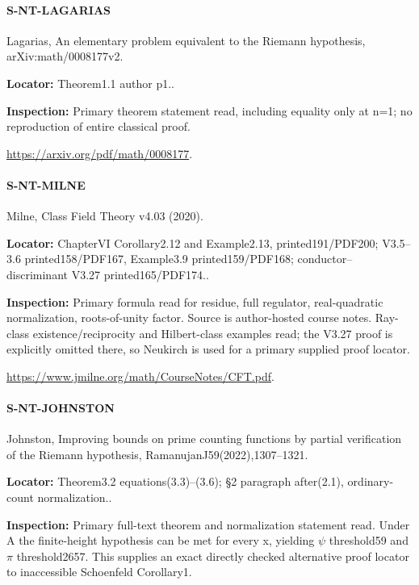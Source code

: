 \documentclass[11pt,a4paper]{article}
\begin{document}
\paragraph{S-NT-LAGARIAS} Lagarias, An elementary problem equivalent to the Riemann hypothesis, arXiv:\allowbreak{}math/\allowbreak{}0008177v2.

\textbf{Locator:} Theorem1.\allowbreak{}1 author p1.\allowbreak{}.

\textbf{Inspection:} Primary theorem statement read, including equality only at n=1; no reproduction of entire classical proof.\allowbreak{}

\url{https://arxiv.org/pdf/math/0008177}.

\paragraph{S-NT-MILNE} Milne, Class Field Theory v4.\allowbreak{}03 (2020).

\textbf{Locator:} ChapterVI Corollary2.\allowbreak{}12 and Example2.\allowbreak{}13, printed191/\allowbreak{}PDF200; V3.\allowbreak{}5–\allowbreak{}3.\allowbreak{}6 printed158/\allowbreak{}PDF167, Example3.\allowbreak{}9 printed159/\allowbreak{}PDF168; conductor–\allowbreak{}discriminant V3.\allowbreak{}27 printed165/\allowbreak{}PDF174.\allowbreak{}.

\textbf{Inspection:} Primary formula read for residue, full regulator, real-quadratic normalization, roots-of-unity factor.\allowbreak{} Source is author-hosted course notes.\allowbreak{} Ray-class existence/\allowbreak{}reciprocity and Hilbert-class examples read; the V3.\allowbreak{}27 proof is explicitly omitted there, so Neukirch is used for a primary supplied proof locator.\allowbreak{}

\url{https://www.jmilne.org/math/CourseNotes/CFT.pdf}.

\paragraph{S-NT-JOHNSTON} Johnston, Improving bounds on prime counting functions by partial verification of the Riemann hypothesis, RamanujanJ59(2022),1307–\allowbreak{}1321.

\textbf{Locator:} Theorem3.\allowbreak{}2 equations(3.\allowbreak{}3)–\allowbreak{}(3.\allowbreak{}6); §2 paragraph after(2.\allowbreak{}1), ordinary-count normalization.\allowbreak{}.

\textbf{Inspection:} Primary full-text theorem and normalization statement read.\allowbreak{} Under A the finite-height hypothesis can be met for every x, yielding \ensuremath{\psi} threshold59 and \ensuremath{\pi} threshold2657.\allowbreak{} This supplies an exact directly checked alternative proof locator to inaccessible Schoenfeld Corollary1.\allowbreak{}
\end{document}
